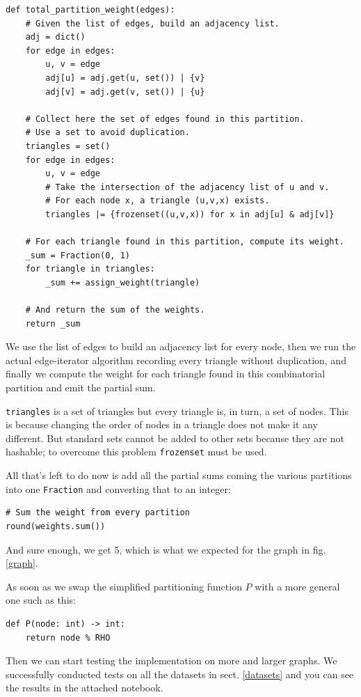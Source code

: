 \documentclass[paper=a4, fontsize=11pt]{scrartcl}
\begin{document}
\begin{verbatim}
def total_partition_weight(edges):
    # Given the list of edges, build an adjacency list.
    adj = dict()
    for edge in edges:
        u, v = edge
        adj[u] = adj.get(u, set()) | {v}
        adj[v] = adj.get(v, set()) | {u}
        
    # Collect here the set of edges found in this partition.
    # Use a set to avoid duplication.
    triangles = set()
    for edge in edges:
        u, v = edge
        # Take the intersection of the adjacency list of u and v.
        # For each node x, a triangle (u,v,x) exists.
        triangles |= {frozenset((u,v,x)) for x in adj[u] & adj[v]}
    
    # For each triangle found in this partition, compute its weight.
    _sum = Fraction(0, 1)
    for triangle in triangles:
        _sum += assign_weight(triangle)
        
    # And return the sum of the weights.
    return _sum
\end{verbatim}

We use the list of edges to build an adjacency list for every node, then we run
the actual edge-iterator algorithm recording every triangle without duplication,
and finally we compute the weight for each triangle found in this combinatorial
partition and emit the partial sum.

\texttt{triangles} is a set of triangles but every triangle is, in
turn, a set of nodes. This is because changing the order of nodes in a triangle
does not make it any different. But standard sets cannot be added to other sets
because they are not hashable; to overcome this problem
\texttt{frozenset} must be used.

All that's left to do now is add all the partial sums coming the various
partitions into one \texttt{Fraction} and converting that to an
integer:
\begin{verbatim}
# Sum the weight from every partition
round(weights.sum())
\end{verbatim}
And sure enough, we get 5, which is what we expected for the graph in fig.
\ref{graph}.

As soon as we swap the simplified partitioning function $P$ with a more general
one such as this:
\begin{verbatim}
def P(node: int) -> int:
    return node % RHO
\end{verbatim}
Then we can start testing the implementation on more and larger graphs. We
successfully conducted tests on all the datasets in sect. \ref{datasets} and you
can see the results in the attached notebook.
\end{document}
